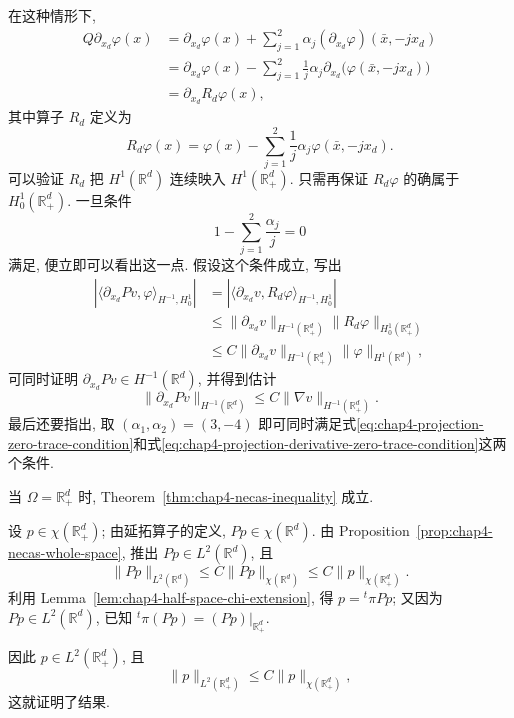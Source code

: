 \begin{Proof}
\begin{itemize}
\begin{itemize}
  在这种情形下,
  \[
  \begin{aligned}
   Q\partial_{x_d}\varphi(x)
   &=\partial_{x_d}\varphi(x)
   +\sum_{j=1}^2\alpha_j(\partial_{x_d}\varphi)(\bar x,-jx_d)\\
   &=\partial_{x_d}\varphi(x)
   -\sum_{j=1}^2\frac1j\alpha_j\partial_{x_d}\bigl(\varphi(\bar x,-jx_d)\bigr)\\
   &=\partial_{x_d}R_d\varphi(x),
  \end{aligned}
  \]
  其中算子 $R_d$ 定义为
  \[
   R_d\varphi(x)=\varphi(x)-\sum_{j=1}^2\frac1j\alpha_j\varphi(\bar x,-jx_d).
  \]
  可以验证 $R_d$ 把 $H^1(\mathbb R^d)$ 连续映入 $H^1(\mathbb R_+^d)$. 只需再保证 $R_d\varphi$ 的确属于 $H_0^1(\mathbb R_+^d)$. 一旦条件
  \begin{equation}
   1-\sum_{j=1}^2\frac{\alpha_j}{j}=0
   \label{eq:chap4-projection-derivative-zero-trace-condition}
  \end{equation}
  满足, 便立即可以看出这一点. 假设这个条件成立, 写出
  \[
  \begin{aligned}
   |\langle\partial_{x_d}Pv,\varphi\rangle_{H^{-1},H_0^1}|
   &=|\langle\partial_{x_d}v,R_d\varphi\rangle_{H^{-1},H_0^1}|\\
   &\leq\|\partial_{x_d}v\|_{H^{-1}(\mathbb R_+^d)}
   \|R_d\varphi\|_{H_0^1(\mathbb R_+^d)}\\
   &\leq C\|\partial_{x_d}v\|_{H^{-1}(\mathbb R_+^d)}\|\varphi\|_{H^1(\mathbb R^d)},
  \end{aligned}
  \]
  可同时证明 $\partial_{x_d}Pv\in H^{-1}(\mathbb R^d)$, 并得到估计
  \[
   \|\partial_{x_d}Pv\|_{H^{-1}(\mathbb R^d)}
   \leq C\|\nabla v\|_{H^{-1}(\mathbb R_+^d)}.
  \]
  最后还要指出, 取 $(\alpha_1,\alpha_2)=(3,-4)$ 即可同时满足式\eqref{eq:chap4-projection-zero-trace-condition}和式\eqref{eq:chap4-projection-derivative-zero-trace-condition}这两个条件.
 \end{itemize}
\end{itemize}
\end{Proof}

\begin{Proposition}
\label{prop:chap4-necas-flat-half-space}
当 $\Omega=\mathbb R_+^d$ 时, Theorem~\ref{thm:chap4-necas-inequality} 成立.
\end{Proposition}

\begin{Proof}
设 $p\in\chi(\mathbb R_+^d)$; 由延拓算子的定义, $Pp\in\chi(\mathbb R^d)$. 由 Proposition~\ref{prop:chap4-necas-whole-space}, 推出 $Pp\in L^2(\mathbb R^d)$, 且
\[
 \|Pp\|_{L^2(\mathbb R^d)}
 \leq C\|Pp\|_{\chi(\mathbb R^d)}
 \leq C\|p\|_{\chi(\mathbb R_+^d)}.
\]
利用 Lemma~\ref{lem:chap4-half-space-chi-extension}, 得 $p={}^{t}\!\pi Pp$; 又因为 $Pp\in L^2(\mathbb R^d)$, 已知 ${}^{t}\!\pi(Pp)=(Pp)|_{\mathbb R_+^d}$.

因此 $p\in L^2(\mathbb R_+^d)$, 且
\[
 \|p\|_{L^2(\mathbb R_+^d)}
 \leq C\|p\|_{\chi(\mathbb R_+^d)},
\]
这就证明了结果.
\end{Proof}

